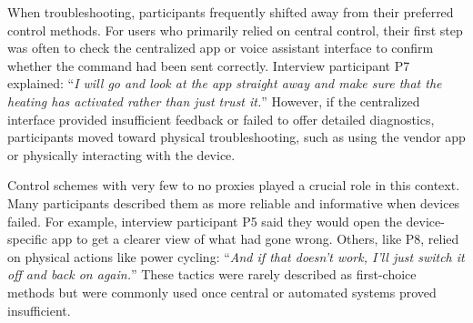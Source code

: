When troubleshooting, participants frequently shifted away from their preferred control methods. For users who primarily relied on central control, their first step was often to check the centralized app or voice assistant interface to confirm whether the command had been sent correctly. Interview participant P7 explained: ``\textit{I will go and look at the app straight away and make sure that the heating has activated rather than just trust it.}'' However, if the centralized interface provided insufficient feedback or failed to offer detailed diagnostics, participants moved toward physical troubleshooting, such as using the vendor app or physically interacting with the device.

Control schemes with very few to no proxies played a crucial role in this context. Many participants described them as more reliable and informative when devices failed. For example, interview participant P5 said they would open the device-specific app to get a clearer view of what had gone wrong. Others, like P8, relied on physical actions like power cycling: ``\textit{And if that doesn't work, I'll just switch it off and back on again.}'' These tactics were rarely described as first-choice methods but were commonly used once central or automated systems proved insufficient.


